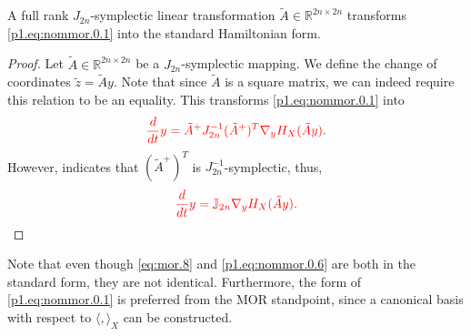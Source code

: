 \begin{lemma} \label{thm:4.2}
A full rank $J_{2n}$-symplectic linear transformation $\tilde A \in \mathbb R^{2n\times 2n}$ transforms \eqref{p1.eq:nommor.0.1} into the standard Hamiltonian form. 
\end{lemma}

\begin{proof}
Let $\tilde A\in \mathbb R^{2n\times 2n}$ be a $J_{2n}$-symplectic mapping. We define the change of coordinates $\tilde z = \tilde Ay$. Note that since $\tilde A$ is a square matrix, we can indeed require this relation to be an equality. This transforms \eqref{p1.eq:nommor.0.1} into
\begin{equation} \label{p1.eq:nommor.0.5}
	\edit{ \frac{d}{dt} y = \tilde A^+ J_{2n}^{-1} (\tilde A^+)^T \nabla_y H_X(\tilde Ay).}
\end{equation}
However,  indicates that $(\tilde A^+)^T$ is $J_{2n}^{-1}$-symplectic, thus,
\begin{equation} \label{p1.eq:nommor.0.6}
	\edit{ \frac{d}{dt} y = \mathbb J_{2n} \nabla_y H_X(\tilde Ay).}
\end{equation}
\end{proof}
Note that even though \eqref{eq:mor.8} and \eqref{p1.eq:nommor.0.6} are both in the standard form, they are not identical. Furthermore, the form of \eqref{p1.eq:nommor.0.1} is preferred from the MOR standpoint, since a canonical basis with respect to $\langle,\rangle_X$ can be constructed.

